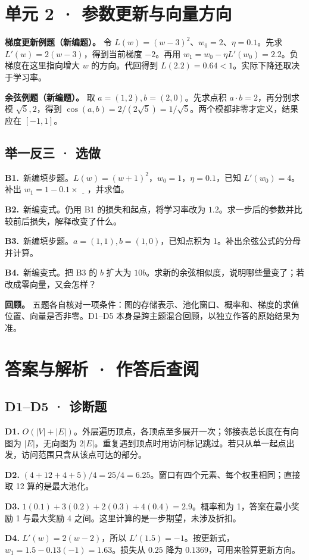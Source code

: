 \documentclass[UTF8,a4paper,11pt]{ctexart}
\newcommand{\PracticeQuestion}[3]{\par\Needspace{4\baselineskip}\noindent\begin{minipage}{\linewidth}\textbf{#1.}\ #2\par\noindent\rule{0pt}{#3mm}\par\end{minipage}\par}
\begin{document}
\section{单元 2 · 参数更新与向量方向}
\textbf{梯度更新例题（新编题）。} 令 $L(w)=(w-3)^2$、$w_0=2$、$\eta=0.1$。先求 $L'(w)=2(w-3)$，得到当前梯度 $-2$。再用 $w_1=w_0-\eta L'(w_0)=2.2$。负梯度在这里指向增大 $w$ 的方向。代回得到 $L(2.2)=0.64<1$。实际下降还取决于学习率。

\textbf{余弦例题（新编题）。} 取 $a=(1,2),b=(2,0)$。先求点积 $a\cdot b=2$，再分别求模 $\sqrt5,2$，得到 $\cos(a,b)=2/(2\sqrt5)=1/\sqrt5$。两个模都非零才定义，结果应在 $[-1,1]$。

\subsection{举一反三 · 选做}
\PracticeQuestion{B1}{新编填步题。$L(w)=(w+1)^2$，$w_0=1$，$\eta=0.1$，已知 $L'(w_0)=4$。补出 $w_1=1-0.1\times\underline{\quad}$，并求值。}{18}
\PracticeQuestion{B2}{新编变式。仍用 B1 的损失和起点，将学习率改为 $1.2$。求一步后的参数并比较前后损失，解释改变了什么。}{18}
\PracticeQuestion{B3}{新编填步题。$a=(1,1),b=(1,0)$，已知点积为 1。补出余弦公式的分母并计算。}{18}
\PracticeQuestion{B4}{新编变式。把 B3 的 $b$ 扩大为 $10b$。求新的余弦相似度，说明哪些量变了；若改成零向量，又会怎样？}{18}
\textbf{回顾。} 五题各自核对一项条件：图的存储表示、池化窗口、概率和、梯度的求值位置、向量是否非零。D1–D5 本身是跨主题混合回顾，以独立作答的原始结果为准。

\clearpage
\section{答案与解析 · 作答后查阅}
\subsection{D1–D5 · 诊断题}
\textbf{D1.} $O(|V|+|E|)$。外层遍历顶点，各顶点至多展开一次；邻接表总长度在有向图为 $|E|$，无向图为 $2|E|$。重复遇到顶点时用访问标记跳过。若只从单一起点出发，访问范围只含从该点可达的部分。

\textbf{D2.} $(4+12+4+5)/4=25/4=6.25$。窗口有四个元素、每个权重相同；直接取 12 算的是最大池化。

\textbf{D3.} $1(0.1)+3(0.2)+2(0.3)+4(0.4)=2.9$。概率和为 1，答案在最小奖励 1 与最大奖励 4 之间。这里计算的是一步期望，未涉及折扣。

\textbf{D4.} $L'(w)=2(w-2)$，所以 $L'(1.5)=-1$。按更新式，$w_1=1.5-0.13(-1)=1.63$。损失从 $0.25$ 降为 $0.1369$，可用来验算更新方向。
\end{document}
